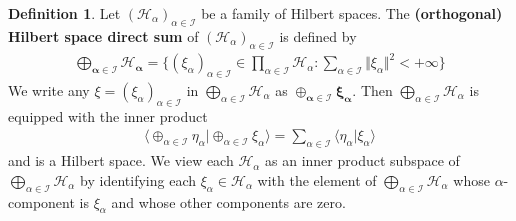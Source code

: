 \documentclass[12pt,b5paper,notitlepage]{article}
\theoremstyle{definition}
\newtheorem{df}{Definition}[subsection]
\theoremstyle{plain}
\newcommand{\bk}[1]{\langle {#1}\rangle}
\newcommand{\bigbk}[1]{\big\langle {#1}\big\rangle}
\newcommand{\MH}{\mathcal H}
\newcommand{\SI}{\mathscr I}
\numberwithin{equation}{section}
\begin{document}
\begin{df}
Let $(\MH_\alpha)_{\alpha\in\SI}$ be a family of Hilbert spaces. The \textbf{(orthogonal) Hilbert space direct sum}  of $(\MH_\alpha)_{\alpha\in\SI}$ is defined by
\begin{align*}
\pmb{\bigoplus_{\alpha\in\SI}\MH_\alpha}=\Big\{(\xi_\alpha)_{\alpha\in\SI}\in\prod_{\alpha\in\SI}\MH_\alpha:\sum_{\alpha\in\SI}\Vert\xi_\alpha\Vert^2<+\infty\Big\}
\end{align*}
We write any $\xi=(\xi_\alpha)_{\alpha\in\SI}$ in $\bigoplus_{\alpha\in\SI}\MH_\alpha$ as $\pmb{\oplus_{\alpha\in\SI}\xi_\alpha}$. Then $\bigoplus_{\alpha\in\SI}\MH_\alpha$ is equipped with the inner product
\begin{align}\label{eq171}
\bigbk{\oplus_{\alpha\in\SI}\eta_\alpha\big|\oplus_{\alpha\in\SI}\xi_\alpha }=\sum_{\alpha\in\SI}\bk{\eta_\alpha|\xi_\alpha}
\end{align}
and is a Hilbert space. We view each $\MH_\alpha$ as an inner product subspace of $\bigoplus_{\alpha\in\SI}\MH_\alpha$ by identifying each $\xi_\alpha\in\MH_\alpha$ with the element of $\bigoplus_{\alpha\in\SI}\MH_\alpha$ whose $\alpha$-component is $\xi_\alpha$ and whose other components are zero.
\end{df}
\end{document}
